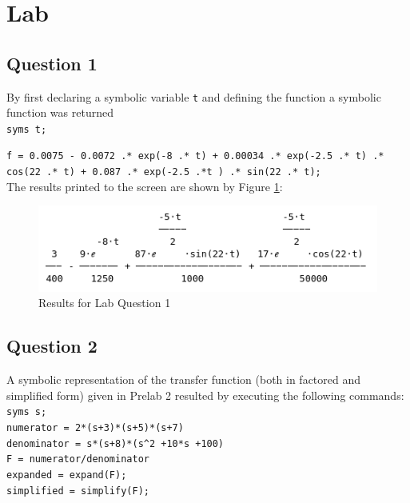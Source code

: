 \documentclass[12pt, a4paper]{article}
\begin{document}
	\newpage
	\section{Lab} %
	\subsection{Question 1}
	By first declaring a symbolic variable \texttt{t} and defining the function a symbolic function was returned\\


	\texttt{syms t;}\par
  	\texttt{f = 0.0075 - 0.0072 .* exp(-8 .* t) + 0.00034 .* exp(-2.5 .* t) .* cos(22 .* t) + 0.087 .* exp(-2.5 .*t ) .* sin(22 .* t);}\\

  	The results printed to the screen are shown by Figure \ref{fig:question_1}:\\

  	\begin{figure}[H]
		\centering
		\includegraphics[width=\textwidth]{question_1}
		\caption{Results for Lab Question 1}
		\label{fig:question_1}
	\end{figure}

	\subsection*{Question 2}
	A symbolic representation of the transfer function (both in factored and simplified form) given in Prelab 2 resulted by executing the following commands:\\

	\texttt{syms s;}\\
    \texttt{numerator = 2*(s+3)*(s+5)*(s+7)}\\
    \texttt{denominator = s*(s+8)*(s\^{}2 +10*s +100)}\\
    \texttt{F = numerator/denominator}\\
    \texttt{expanded = expand(F);}\\
    \texttt{simplified = simplify(F);}\\
\end{document}
